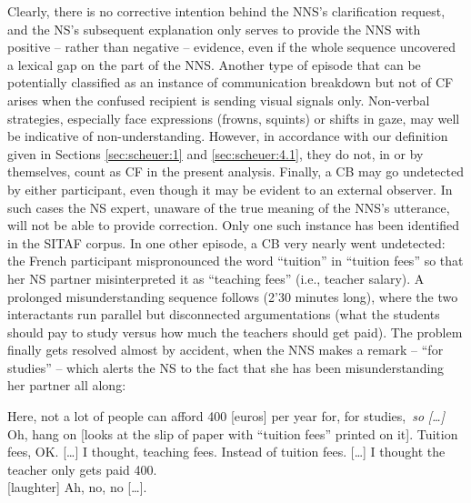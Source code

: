 \documentclass[output=paper,colorlinks,citecolor=brown,modfonts,nonflat]{../langscibook}
\begin{document}
Clearly, there is no corrective intention behind the NNS’s clarification request, and the NS’s subsequent explanation only serves to provide the NNS with positive – rather than negative – evidence, even if the whole sequence uncovered a lexical gap on the part of the NNS. Another type of episode that can be potentially classified as an instance of communication breakdown but not of CF arises when the confused recipient is sending visual signals only. Non-verbal strategies, especially face expressions (frowns, squints) or shifts in gaze, may well be indicative of non-understanding. However, in accordance with our definition given in Sections \ref{sec:scheuer:1} and \ref{sec:scheuer:4.1}, they do not, in or by themselves, count as CF in the present analysis. Finally, a CB may go undetected by either participant, even though it may be evident to an external observer. In such cases the NS expert, unaware of the true meaning of the NNS’s utterance, will not be able to provide correction. Only one such instance has been identified in the SITAF corpus. In one other episode, a CB very nearly went undetected: the French participant mispronounced the word “tuition” in “tuition fees” so that her NS partner misinterpreted it as “teaching fees” (i.e., teacher salary). A prolonged misunderstanding sequence follows (2’30 minutes long), where the two interactants run parallel but disconnected argumentations (what the students should pay to study versus how much the teachers should get paid). The problem finally gets resolved almost by accident, when the NNS makes a remark – “for studies” – which alerts the NS to the fact that she has been misunderstanding her partner all along:

\ea\label{ex:scheuer:14}
{\NNS} {Here,} {not} {a} {lot} {of} {people} {can} {afford} {400} [euros] {per} {year} {for,} {for} {studies,}\
\textit{so} \textit{[…]}\\
{\NS} {Oh,} {hang} {on} [looks at the slip of paper with “tuition fees” printed on it]. {Tuition} {fees,} {OK.} {[…]} {I} {thought,} {teaching} {fees.} {Instead} {of} {tuition} {fees.} {[…]} {I} {thought} {the} {teacher} {only} {gets} {paid} {400.}\\
{\NNS} [laughter] {Ah,} {no,} {no} {[…].}
\z
\end{document}
